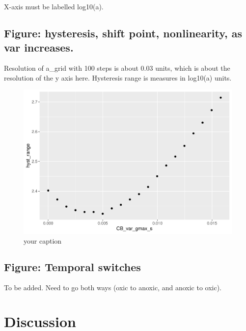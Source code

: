 \documentclass{article}
\begin{document}
X-axis must be labelled log10(a).

\hypertarget{figure-hysteresis-shift-point-nonlinearity-as-var-increases.}{%
\subsection{Figure: hysteresis, shift point, nonlinearity, as var
increases.}\label{figure-hysteresis-shift-point-nonlinearity-as-var-increases.}}

Resolution of a\_grid with 100 steps is about 0.03 units, which is about
the resolution of the y axis here. Hysteresis range is measures in
log10(a) units.

\begin{figure}

{\centering \includegraphics[width=1\linewidth]{article_files/figure-latex/ss_var3-1} 

}

\caption{your caption}\label{fig:ss_var3}
\end{figure}

\hypertarget{figure-temporal-switches}{%
\subsection{Figure: Temporal switches}\label{figure-temporal-switches}}

To be added. Need to go both ways (oxic to anoxic, and anoxic to oxic).

\hypertarget{discussion}{%
\section{Discussion}\label{discussion}}
\end{document}
